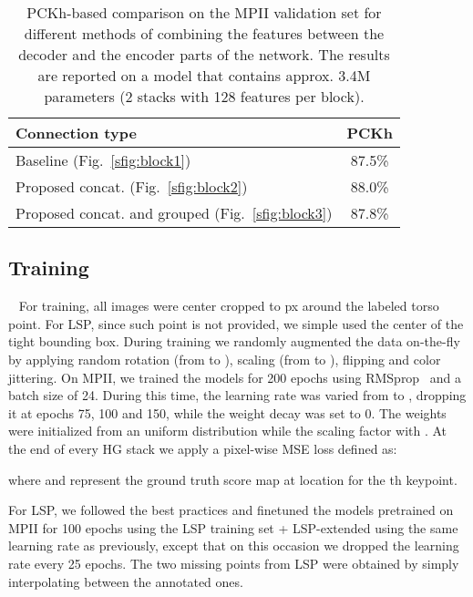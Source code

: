 \documentclass[a4paper, 10pt, conference]{ieeeconf}      \usepackage{FG2020}
\begin{document}
\begin{table}
   \begin{center}
    \begin{tabular}{lc}
    \toprule
    Connection type  &  \textbf{PCKh} \\
    \midrule
    Baseline (Fig.~\ref{sfig:block1})  &  87.5\%  \\
    Proposed concat. (Fig.~\ref{sfig:block2})  &  88.0\%  \\
    Proposed concat. and grouped (Fig.~\ref{sfig:block3})  &  87.8\%  \\
    \bottomrule
    \end{tabular}
    \end{center}
    \caption{PCKh-based comparison on the MPII validation set for different methods of combining the features between the decoder and the encoder parts of the network. The results are reported on a model that contains approx. 3.4M parameters (2 stacks  with 128 features per block).}
    \label{tab:mpii_valid_connections_hg}
\end{table}


\subsection{Training}~\label{ssec:training}
For training, all images were center cropped to px around the labeled torso point. For LSP, since such point is not provided, we simple used the center of the tight bounding box. During training we randomly augmented the data on-the-fly  by applying random rotation (from  to ), scaling (from  to ), flipping and color jittering. On MPII, we trained the models for 200 epochs using RMSprop~\cite{tieleman2012lecture} and a batch size of 24. During this time, the learning rate was varied from  to , dropping it at epochs 75, 100 and 150, while the weight decay was set to 0. The weights were initialized from an uniform distribution while the scaling factor  with .  At the end of every HG stack we apply a pixel-wise MSE loss defined as:


where  and  represent the ground truth score map at location  for the th keypoint.

For LSP, we followed the best practices and finetuned the models pretrained on MPII for 100 epochs using the LSP training set + LSP-extended using the same learning rate as previously, except that on this occasion we dropped the learning rate every 25 epochs. The two missing points from LSP were obtained by simply interpolating between the annotated ones.
\end{document}
